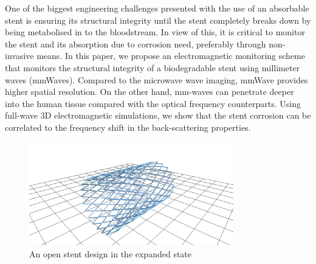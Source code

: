\documentclass[conference,a4paper]{IEEEtran}
\begin{document}
One of the biggest engineering challenges presented with the use of an absorbable stent is ensuring its structural integrity until the stent completely breaks down by being metabolised in to the bloodstream. In view of this, it is critical to monitor the stent and its absorption due to corrosion need, preferably through non-invasive means. In this paper, we propose an electromagnetic monitoring scheme that monitors the structural integrity of a biodegradable stent using millimeter waves (mmWaves). Compared to the microwave wave imaging, mmWave provides higher spatial resolution. On the other hand, mm-waves can penetrate deeper into the human tissue compared with the optical frequency counterparts. Using full-wave 3D electromagnetic simulations, we show that the stent corrosion can be correlated to the frequency shift in the back-scattering properties.
%
\begin{figure}[b!]
  \centering
  \includegraphics[width=3.5in]{Stent.PNG}
  \caption{An open stent design in the expanded state}
  \label{fig:stent}
\end{figure}
%
\vspace{7pt}
\end{document}
